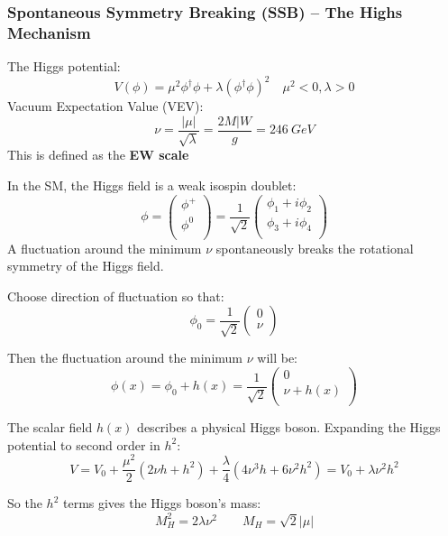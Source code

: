 \subsubsection{Spontaneous Symmetry Breaking (SSB) -- The Highs Mechanism}
The Higgs potential:
$$ V(\phi) = \mu^2\phi^\dag\phi + \lambda(\phi^\dag\phi)^2 \quad \mu^2 < 0, \lambda > 0 $$
Vacuum Expectation Value (VEV):
$$ \nu = \frac{|\mu|}{\sqrt{\lambda}} = \frac{2M|W}{g} = 246\ GeV$$
This is defined as the \textbf{EW scale}

In the SM, the Higgs field is a weak isospin doublet:
\begin{equation}
    \phi = 
	\begin{pmatrix}
	    \phi^+  \\
	    \phi^0  \\
	\end{pmatrix}
      = \frac{1}{\sqrt{2}}
	\begin{pmatrix}
	    \phi_1 + i\phi_2	\\
	    \phi_3 + i\phi_4	\\
	\end{pmatrix}
\end{equation}
A fluctuation around the minimum $\nu$ spontaneously breaks the rotational 
symmetry of the Higgs field.

Choose direction of fluctuation so that:
$$ \phi_0 = \frac{1}{\sqrt{2}} \begin{pmatrix} 0	\\ \nu \\ \end{pmatrix} $$

Then the fluctuation around the minimum $\nu$ will be:
$$ \phi(x) = \phi_0 + h(x) = \frac{1}{\sqrt{2}} \begin{pmatrix} 0	\\ \nu+h(x) \\ \end{pmatrix} $$

The scalar field $h(x)$ describes a physical Higgs boson.
Expanding the Higgs potential to second order in $h^2$:
$$ V = V_0 + \frac{\mu^2}{2}(2\nu h + h^2) + \frac{\lambda}{4} (4\nu^3 h + 6\nu^2 h^2) = V_0 + \lambda\nu^2 h^2 $$

So the $h^2$ terms gives the Higgs boson's mass:
\begin{equation}
    M_H^2 = 2\lambda\nu^2   \qquad M_H = \sqrt{2}|\mu|
\end{equation}

